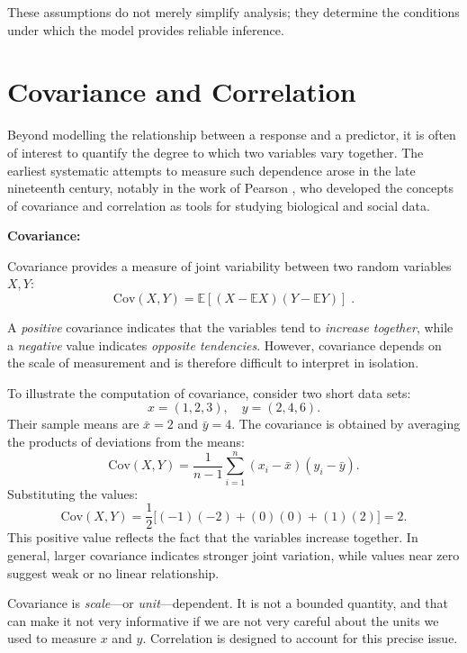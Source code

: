 These assumptions do not merely simplify analysis; they determine the conditions under which the model provides reliable inference.

\section{Covariance and Correlation}

Beyond modelling the relationship between a response and a predictor, it is often of interest to quantify the degree to which two variables vary together. The earliest systematic attempts to measure such dependence arose in the late nineteenth century, notably in the work of Pearson \cite{pearson_1895_contributions}, who developed the concepts of covariance and correlation as tools for studying biological and social data.

\medskip

\textbf{Covariance:}

\medskip

Covariance provides a measure of joint variability between two random variables \(X, Y\):
\begin{equation}
    \mathrm{Cov}(X,Y) = \mathbb{E}[(X-\mathbb{E}X)(Y-\mathbb{E}Y)] \; .
\end{equation}

A \textit{positive} covariance indicates that the variables tend to \textit{increase together}, while a \textit{negative} value indicates \textit{opposite tendencies}. However, covariance depends on the scale of measurement and is therefore difficult to interpret in isolation.

To illustrate the computation of covariance, consider two short data sets:
\[
    x = (1,2,3), \quad y = (2,4,6).
\]
Their sample means are \(\bar{x} = 2\) and \(\bar{y} = 4\). The covariance is obtained by averaging the products of deviations from the means:
\[
    \mathrm{Cov}(X,Y) = \frac{1}{n-1} \sum_{i=1}^n (x_i - \bar{x})(y_i - \bar{y}).
\]
Substituting the values:
\[
    \mathrm{Cov}(X,Y) = \frac{1}{2}\big[(-1)(-2) + (0)(0) + (1)(2)\big] = 2.
\]
This positive value reflects the fact that the variables increase together. In general, larger covariance indicates stronger joint variation, while values near zero suggest weak or no linear relationship.

\medskip

Covariance is \textit{scale}—or \textit{unit}—dependent. It is not a bounded quantity, and that can make it not very informative if we are not very careful about the units we used to measure \(x\) and \(y\). Correlation is designed to account for this precise issue.

